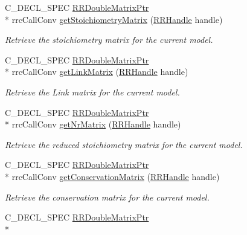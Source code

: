 \begin{DoxyCompactItemize}
C\-\_\-\-D\-E\-C\-L\-\_\-\-S\-P\-E\-C \hyperlink{rrc__types_8h_ae586a879d30f0823087e42d93464b5dd}{R\-R\-Double\-Matrix\-Ptr} \\*
rrc\-Call\-Conv \hyperlink{group___stoich_ga162f8d37e89e83e5e14cee87c02f89f2}{get\-Stoichiometry\-Matrix} (\hyperlink{rrc__types_8h_a1d68f0592372208fa5a5f2799ea4b3ae}{R\-R\-Handle} handle)
\begin{DoxyCompactList}\small\item\em Retrieve the stoichiometry matrix for the current model. \end{DoxyCompactList}\item 
C\-\_\-\-D\-E\-C\-L\-\_\-\-S\-P\-E\-C \hyperlink{rrc__types_8h_ae586a879d30f0823087e42d93464b5dd}{R\-R\-Double\-Matrix\-Ptr} \\*
rrc\-Call\-Conv \hyperlink{group___stoich_gad42abf401bcd8f7bbe9255d6013b512b}{get\-Link\-Matrix} (\hyperlink{rrc__types_8h_a1d68f0592372208fa5a5f2799ea4b3ae}{R\-R\-Handle} handle)
\begin{DoxyCompactList}\small\item\em Retrieve the Link matrix for the current model. \end{DoxyCompactList}\item 
C\-\_\-\-D\-E\-C\-L\-\_\-\-S\-P\-E\-C \hyperlink{rrc__types_8h_ae586a879d30f0823087e42d93464b5dd}{R\-R\-Double\-Matrix\-Ptr} \\*
rrc\-Call\-Conv \hyperlink{group___stoich_ga6f7995e073044c3e1767c9eda148e0c8}{get\-Nr\-Matrix} (\hyperlink{rrc__types_8h_a1d68f0592372208fa5a5f2799ea4b3ae}{R\-R\-Handle} handle)
\begin{DoxyCompactList}\small\item\em Retrieve the reduced stoichiometry matrix for the current model. \end{DoxyCompactList}\item 
C\-\_\-\-D\-E\-C\-L\-\_\-\-S\-P\-E\-C \hyperlink{rrc__types_8h_ae586a879d30f0823087e42d93464b5dd}{R\-R\-Double\-Matrix\-Ptr} \\*
rrc\-Call\-Conv \hyperlink{group___stoich_gab253411012b1974cf831970034453aef}{get\-Conservation\-Matrix} (\hyperlink{rrc__types_8h_a1d68f0592372208fa5a5f2799ea4b3ae}{R\-R\-Handle} handle)
\begin{DoxyCompactList}\small\item\em Retrieve the conservation matrix for the current model. \end{DoxyCompactList}\item 
C\-\_\-\-D\-E\-C\-L\-\_\-\-S\-P\-E\-C \hyperlink{rrc__types_8h_ae586a879d30f0823087e42d93464b5dd}{R\-R\-Double\-Matrix\-Ptr} \\*

\end{DoxyCompactItemize}
